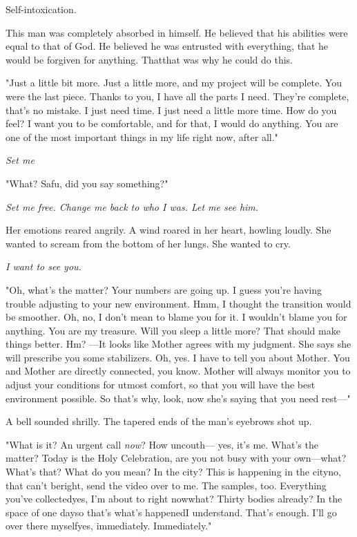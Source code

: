 Self-intoxication.

This man was completely absorbed in himself. He believed that his
abilities were equal to that of God. He believed he was entrusted with
everything, that he would be forgiven for anything. That\el that was why
he could do this.

"Just a little bit more. Just a little more, and my project will be
complete. You were the last piece. Thanks to you, I have all the parts I
need. They're complete, that's no mistake. I just need time. I just need
a little more time. How do you feel? I want you to be comfortable, and
for that, I would do anything. You are one of the most important things
in my life right now, after all."

\emph{Set me\el }

"What? Safu, did you say something?"

\emph{Set me free. Change me back to who I was. Let me see him.}

Her emotions reared angrily. A wind roared in her heart, howling loudly.
She wanted to scream from the bottom of her lungs. She wanted to cry.

\emph{I want to see you.}

"Oh, what's the matter? Your numbers are going up. I guess you're having
trouble adjusting to your new environment. Hmm, I thought the transition
would be smoother. Oh, no, I don't mean to blame you for it. I wouldn't
blame you for anything. You are my treasure. Will you sleep a little
more? That should make things better. Hm? ---It looks like Mother agrees
with my judgment. She says she will prescribe you some stabilizers. Oh,
yes. I have to tell you about Mother. You and Mother are directly
connected, you know. Mother will always monitor you to adjust your
conditions for utmost comfort, so that you will have the best
environment possible. So that's why, look, now she's saying that you
need rest---"

A bell sounded shrilly. The tapered ends of the man's eyebrows shot up.

"What is it? An urgent call \emph{now}? How uncouth--- yes, it's me. What's the
matter? Today is the Holy Celebration, are you not busy with your
own---what? What's that? What do you mean? In the city? This is happening
in the city\el no, that can't be\el right, send the video over to me.
The samples, too. Everything you've collected\el yes, I'm about to right
now\el what? Thirty bodies already? In the space of one day\el so that's
what's happened\el I understand. That's enough. I'll go over there
myself\el yes, immediately. Immediately."

